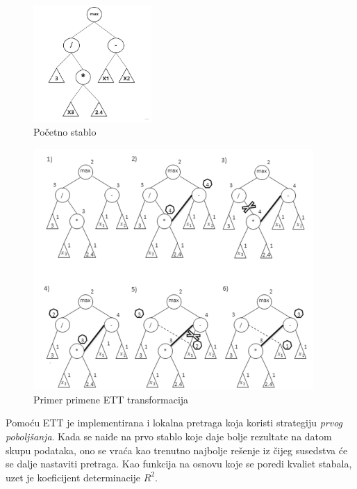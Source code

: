 \documentclass[main.tex]{subfiles}
\begin{document}
\begin{figure}[!ht]
\begin{center}
\includegraphics[width=0.4\textwidth]{../images/syntax_tree.jpg}
\end{center}
\caption{Početno stablo}
\label{fig:syntaxTree}
\end{figure}

\begin{figure}[!ht]
\begin{center}
\includegraphics[width=0.95\textwidth]{../images/ett.png}
\end{center}
\caption{Primer primene ETT transformacija}
\label{fig:ett}
\end{figure}

Pomoću ETT je implementirana i lokalna pretraga koja koristi strategiju \textit{prvog poboljšanja}. Kada se naiđe na prvo stablo koje daje bolje rezultate na datom skupu podataka, ono se vraća kao trenutno najbolje rešenje iz čijeg susedstva će se dalje nastaviti pretraga. Kao funkcija na osnovu koje se poredi kvaliet stabala, uzet je koeficijent determinacije $R^{2}$. 
\end{document}
